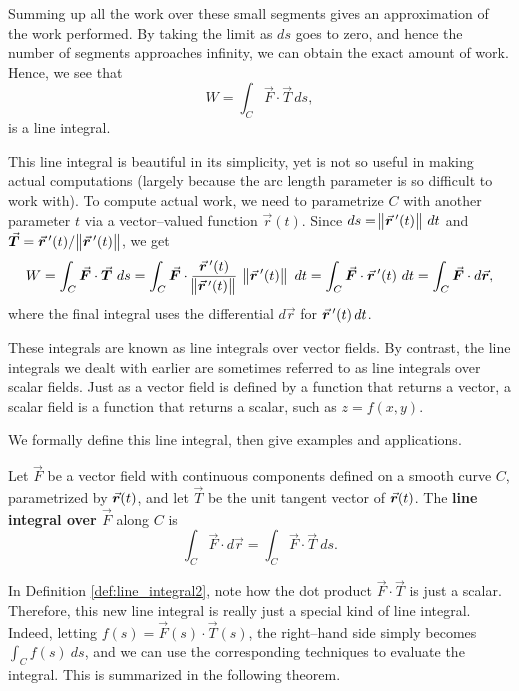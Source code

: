 Summing up all the work over these small segments gives an approximation of the work performed. By taking the limit as $ds$ goes to zero, and hence the number of segments approaches infinity, we can obtain the exact amount of work. Hence, we see that 
$$W = \int_C \vec F\cdot \vec T\,ds,$$
is a line integral.

This line integral is beautiful in its simplicity, yet is not so useful in making actual computations (largely because the arc length parameter is so difficult to work with). To compute actual work, we need to parametrize $C$ with another parameter $t$ via a vector--valued function $\vec r(t)$. Since $ds = \norm{\vrp(t)}\,dt$ and $\vec T = \vrp(t)/\norm{\vrp(t)}$, we get
\begin{equation}
W = \int_C \vec F\cdot\vec T\ ds = \int_C \vec F\cdot \frac{\vrp(t)}{\norm{\vrp(t)}}\ \norm{\vrp(t)}\ dt = \int_C\vec F\cdot \vrp(t)\ dt = \int_C \vec F\cdot d\vec r,
\label{eq:line_integral}\end{equation}
where the final integral uses the differential $d\vec r$ for $\vrp(t)\,dt$.

These integrals are known as line integrals over vector fields. By contrast, the line integrals we dealt with earlier are sometimes referred to as line integrals over scalar fields. Just as a vector field is defined by a function that returns a vector, a scalar field is a function that returns a scalar, such as $z = f(x,y)$.

We formally define this line integral, then give examples and applications.

\begin{definition}\label{def:line_integral2}
Let $\vec F$ be a vector field with continuous components defined on a smooth curve $C$, parametrized by $\vrt$, and let $\vec T$ be the unit tangent vector of $\vrt$. The \textbf{line integral over $\vec F$} along $C$ is
$$\int_C \vec F\cdot d\vec r = \int_C \vec F\cdot\vec T\ ds.$$
\end{definition}

In Definition \ref{def:line_integral2}, note how the dot product $\vec F \cdot \vec T$ is just a scalar. 
Therefore, this new line integral is really just a special kind of line integral. Indeed, letting $f(s) = \vec F(s)\cdot \vec T(s)$, the right--hand side simply becomes $\int_C f(s)\ ds$, and we can use the corresponding techniques to evaluate the integral. This is summarized in the following theorem. 

